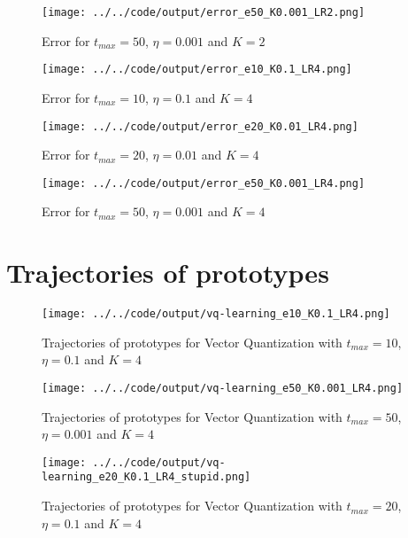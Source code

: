 \documentclass[twoside, a4paper, fleqn, reqno]{article}
\begin{document}
\begin{figure}[H]
	\centering
	\texttt{[image: ../../code/output/error\_e50\_K0.001\_LR2.png]}
	\caption{Error for $t_{max}=50$, $\eta = 0.001$ and $K = 2$}
	\label{fig:error_e50_K0.001_LR2}
\end{figure}

\begin{figure}[H]
	\centering
	\texttt{[image: ../../code/output/error\_e10\_K0.1\_LR4.png]}
	\caption{Error for $t_{max}=10$, $\eta = 0.1$ and $K = 4$}
	\label{fig:error_e10_K0.1_LR4}
\end{figure}

\begin{figure}[H]
	\centering
	\texttt{[image: ../../code/output/error\_e20\_K0.01\_LR4.png]}
	\caption{Error for $t_{max}=20$, $\eta = 0.01$ and $K = 4$}
	\label{fig:error_e20_K0.01_LR4}
\end{figure}

\begin{figure}[H]
	\centering
	\texttt{[image: ../../code/output/error\_e50\_K0.001\_LR4.png]}
	\caption{Error for $t_{max}=50$, $\eta = 0.001$ and $K = 4$}
	\label{fig:error_e50_K0.001_LR4}
\end{figure}

\section{Trajectories of prototypes}

\begin{figure}[H]
	\centering
	\texttt{[image: ../../code/output/vq-learning\_e10\_K0.1\_LR4.png]}
	\caption{Trajectories of prototypes for Vector Quantization with $t_{max}=10$, $\eta=0.1$ and $K=4$}
	\label{fig:vq-learning_e10_K0.1_LR4}
\end{figure}

\begin{figure}[H]
	\centering
	\texttt{[image: ../../code/output/vq-learning\_e50\_K0.001\_LR4.png]}
	\caption{Trajectories of prototypes for Vector Quantization with $t_{max}=50$, $\eta=0.001$ and $K=4$}
	\label{fig:vq-learning_e50_K0.001_LR4}
\end{figure}

\begin{figure}[H]
	\centering
	\texttt{[image: ../../code/output/vq-learning\_e20\_K0.1\_LR4\_stupid.png]}
	\caption{Trajectories of prototypes for Vector Quantization with $t_{max}=20$, $\eta=0.1$ and $K=4$}
	\label{fig:vq-learning_e20_K0.1_LR4_stupid}
\end{figure}
\end{document}
